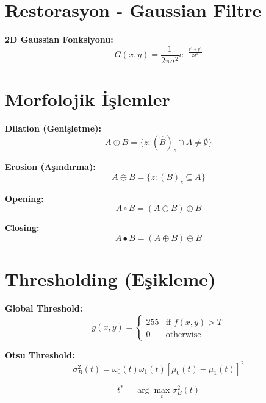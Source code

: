 \documentclass[12pt,a4paper]{article}
\begin{document}
\section{Restorasyon - Gaussian Filtre}

\textbf{2D Gaussian Fonksiyonu:}
\begin{equation}
G(x,y) = \frac{1}{2\pi\sigma^2} e^{-\frac{x^2 + y^2}{2\sigma^2}}
\end{equation}

\section{Morfolojik İşlemler}

\textbf{Dilation (Genişletme):}
\begin{equation}
A \oplus B = \{z : (\hat{B})_z \cap A \neq \emptyset\}
\end{equation}

\textbf{Erosion (Aşındırma):}
\begin{equation}
A \ominus B = \{z : (B)_z \subseteq A\}
\end{equation}

\textbf{Opening:}
\begin{equation}
A \circ B = (A \ominus B) \oplus B
\end{equation}

\textbf{Closing:}
\begin{equation}
A \bullet B = (A \oplus B) \ominus B
\end{equation}

\section{Thresholding (Eşikleme)}

\textbf{Global Threshold:}
\begin{equation}
g(x,y) = \begin{cases} 255 & \text{if } f(x,y) > T \\ 0 & \text{otherwise} \end{cases}
\end{equation}

\textbf{Otsu Threshold:}
\begin{equation}
\sigma_B^2(t) = \omega_0(t)\omega_1(t)[\mu_0(t) - \mu_1(t)]^2
\end{equation}

\begin{equation}
t^* = \arg\max_{t} \sigma_B^2(t)
\end{equation}
\end{document}
